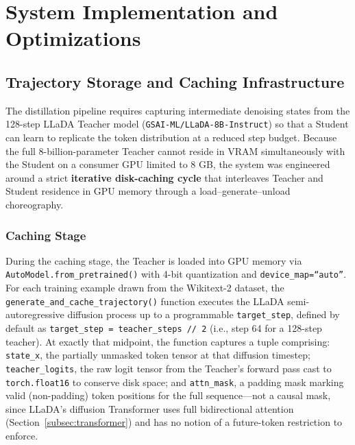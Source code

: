 \documentclass[11pt, a4paper]{article}
\begin{document}
\section{System Implementation and Optimizations}
\label{sec:implementation}

\subsection{Trajectory Storage and Caching Infrastructure}
\label{subsec:trajectory_storage}

The distillation pipeline requires capturing intermediate denoising states from the 128-step LLaDA Teacher model (\texttt{GSAI-ML/LLaDA-8B-Instruct}) so that a Student can learn to replicate the token distribution at a reduced step budget. Because the full 8-billion-parameter Teacher cannot reside in VRAM simultaneously with the Student on a consumer GPU limited to 8 GB, the system was engineered around a strict \textbf{iterative disk-caching cycle} that interleaves Teacher and Student residence in GPU memory through a load--generate--unload choreography.

\subsubsection{Caching Stage}

During the caching stage, the Teacher is loaded into GPU memory via \texttt{\footnotesize AutoModel.from\_pretrained()} with 4-bit quantization and \texttt{device\_map=``auto''}. For each training example drawn from the Wikitext-2 dataset, the \texttt{generate\_and\_cache\_trajectory()} function executes the LLaDA semi-autoregressive diffusion process up to a programmable \texttt{target\_step}, defined by default as \texttt{target\_step = teacher\_steps // 2} (i.e., step 64 for a 128-step teacher). At exactly that midpoint, the function captures a tuple comprising: \texttt{state\_x}, the partially unmasked token tensor at that diffusion timestep; \texttt{teacher\_logits}, the raw logit tensor from the Teacher's forward pass cast to \texttt{torch.float16} to conserve disk space; and \texttt{attn\_mask}, a padding mask marking valid (non-padding) token positions for the full sequence---not a causal mask, since LLaDA's diffusion Transformer uses full bidirectional attention (Section~\ref{subsec:transformer}) and has no notion of a future-token restriction to enforce.
\end{document}
